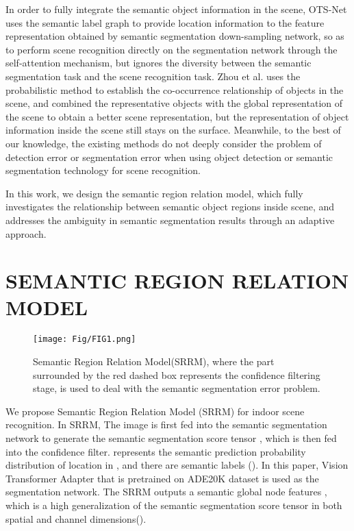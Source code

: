 \documentclass[conference]{IEEEtran}
\begin{document}
In order to fully integrate the semantic object information in the scene, OTS-Net\cite{ref16} uses the semantic label graph to provide location information to the feature representation obtained by semantic segmentation down-sampling network, so as to perform scene recognition directly on the segmentation network through the self-attention mechanism, but ignores the diversity between the semantic segmentation task and the scene recognition task. Zhou et al.\cite{ref20} uses the probabilistic method to establish the co-occurrence relationship of objects in the scene, and combined the representative objects with the global representation of the scene to obtain a better scene representation, but the representation of object information inside the scene still stays on the surface. Meanwhile, to the best of our knowledge, the existing methods do not deeply consider the problem of detection error or segmentation error when using object detection or semantic segmentation technology for scene recognition.

In this work, we design the semantic region relation model, which fully investigates the relationship between semantic object regions inside scene, and addresses the ambiguity in semantic segmentation results through an adaptive approach.

\section{SEMANTIC REGION RELATION MODEL}

\begin{figure*}[htbp]
    \centering
    \texttt{[image: Fig/FIG1.png]}
    \caption{Semantic Region Relation Model(SRRM), where the part surrounded by the red dashed box represents the confidence filtering stage, is used to deal with the semantic segmentation error problem.}
    \label{Fig1}
\end{figure*}

We propose Semantic Region Relation Model (SRRM) for indoor scene recognition. In SRRM, The image  is first fed into the semantic segmentation network to generate the semantic segmentation score tensor , which is then fed into the confidence filter.  represents the semantic prediction probability distribution of location  in , and there are  semantic labels ().  In this paper, Vision Transformer Adapter \cite{ref22} that is pretrained on ADE20K dataset\cite{ref23} is used as the segmentation network. The SRRM outputs a semantic global node features , which is a high generalization of the semantic segmentation score tensor in both spatial and channel dimensions().
\end{document}
